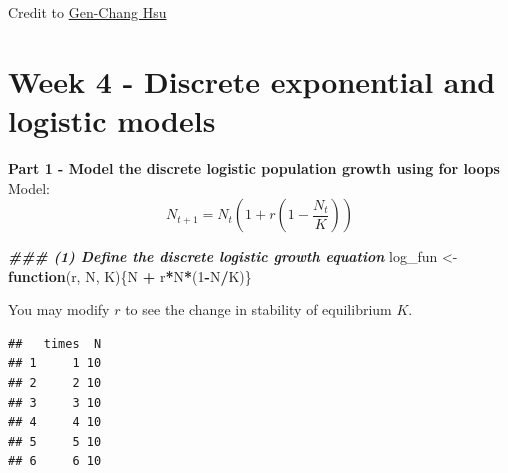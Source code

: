\documentclass[
]{book}
\newenvironment{Shaded}{\begin{snugshade}}{\end{snugshade}}
\newcommand{\AttributeTok}[1]{\textcolor[rgb]{0.13,0.29,0.53}{#1}}
\newcommand{\ControlFlowTok}[1]{\textcolor[rgb]{0.13,0.29,0.53}{\textbf{#1}}}
\newcommand{\DecValTok}[1]{\textcolor[rgb]{0.00,0.00,0.81}{#1}}
\newcommand{\DocumentationTok}[1]{\textcolor[rgb]{0.56,0.35,0.01}{\textbf{\textit{#1}}}}
\newcommand{\FloatTok}[1]{\textcolor[rgb]{0.00,0.00,0.81}{#1}}
\newcommand{\FunctionTok}[1]{\textcolor[rgb]{0.13,0.29,0.53}{\textbf{#1}}}
\newcommand{\NormalTok}[1]{#1}
\newcommand{\OtherTok}[1]{\textcolor[rgb]{0.56,0.35,0.01}{#1}}
\newcommand{\SpecialCharTok}[1]{\textcolor[rgb]{0.81,0.36,0.00}{\textbf{#1}}}
\begin{document}
Credit to \href{https://genchanghsu.github.io/index.html}{Gen-Chang Hsu}

\hypertarget{week-4---discrete-exponential-and-logistic-models}{%
\chapter*{Week 4 - Discrete exponential and logistic models}\label{week-4---discrete-exponential-and-logistic-models}}

\textbf{Part 1 - Model the discrete logistic population growth using for loops}
Model:
\[
N_{t+1} = N_t(1+r(1-\frac{N_t}{K}))
\]

\begin{Shaded}
\begin{Highlighting}[]
\DocumentationTok{\#\#\# (1) Define the discrete logistic growth equation}
\NormalTok{log\_fun }\OtherTok{\textless{}{-}} \ControlFlowTok{function}\NormalTok{(r, N, K)\{N }\SpecialCharTok{+}\NormalTok{ r}\SpecialCharTok{*}\NormalTok{N}\SpecialCharTok{*}\NormalTok{(}\DecValTok{1}\SpecialCharTok{{-}}\NormalTok{N}\SpecialCharTok{/}\NormalTok{K)\}}
\end{Highlighting}
\end{Shaded}

You may modify \(r\) to see the change in stability of equilibrium \(K\).

\begin{Shaded}
\end{Shaded}

\begin{verbatim}
##   times  N
## 1     1 10
## 2     2 10
## 3     3 10
## 4     4 10
## 5     5 10
## 6     6 10
\end{verbatim}
\end{document}
